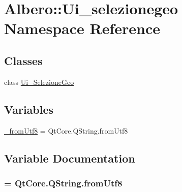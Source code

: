 \hypertarget{namespaceAlbero_1_1Ui__selezionegeo}{
\section{Albero::Ui\_\-selezionegeo Namespace Reference}
\label{namespaceAlbero_1_1Ui__selezionegeo}
}
\subsection*{Classes}
\begin{DoxyCompactItemize}
\item 
class \hyperlink{classAlbero_1_1Ui__selezionegeo_1_1Ui__SelezioneGeo}{Ui\_\-SelezioneGeo}
\end{DoxyCompactItemize}
\subsection*{Variables}
\begin{DoxyCompactItemize}
\item 
\hyperlink{namespaceAlbero_1_1Ui__selezionegeo_a016c04933442f819775c50136a1a5815}{\_\-fromUtf8} = QtCore.QString.fromUtf8
\end{DoxyCompactItemize}


\subsection{Variable Documentation}
\hypertarget{namespaceAlbero_1_1Ui__selezionegeo_a016c04933442f819775c50136a1a5815}{
\subsubsection[{\_\-fromUtf8}]{ = QtCore.QString.fromUtf8}}
\label{namespaceAlbero_1_1Ui__selezionegeo_a016c04933442f819775c50136a1a5815}
